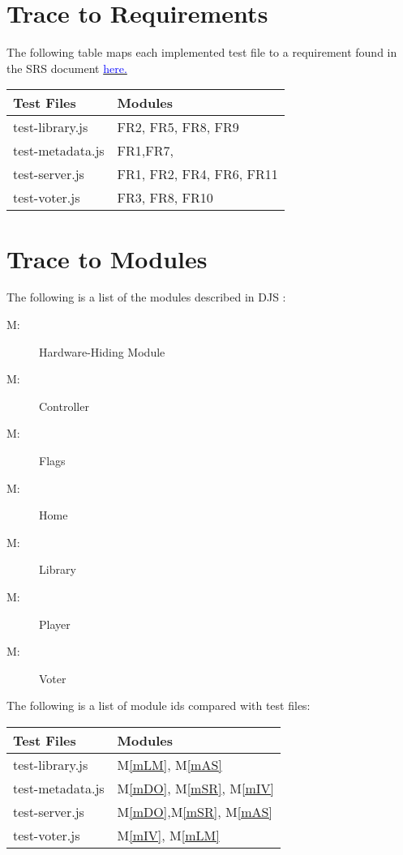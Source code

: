 \documentclass[12pt, titlepage]{article}
\newcounter{mnum}
\newcommand{\mthemnum}{M\themnum}
\newcommand{\mref}[1]{M\ref{#1}}
\begin{document}
\section{Trace to Requirements}
The following table maps each implemented test file to a requirement found in the SRS document \href{run:../../Doc/SRS/SRS.pdf}{\textcolor{blue}{here.}}
\begin{table}[H]
\centering
\begin{tabular}{p{} p{}}
\toprule
\textbf{Test Files} & \textbf{Modules}\\
\midrule
test-library.js & FR2, FR5, FR8, FR9\\
test-metadata.js & FR1,FR7,\\
test-server.js & FR1, FR2, FR4, FR6, FR11\\
test-voter.js & FR3, FR8, FR10\\

\bottomrule
\end{tabular}

\label{TblRT}
\end{table}
\section{Trace to Modules}
The following is a list of the modules described in DJS :
\begin{description}
\item [ \mthemnum \label{mHH}:] Hardware-Hiding Module
\item [ \mthemnum \label{mSR}:] Controller
\item [ \mthemnum \label{mAS}:] Flags
\item [ \mthemnum \label{mDO}:] Home
\item [ \mthemnum \label{mLM}:] Library
\item [ \mthemnum \label{mPM}:] Player
\item [ \mthemnum \label{mIV}:] Voter
\end{description}
The following is a list of module ids compared with test files: 
\begin{table}[H]
\centering
\begin{tabular}{p{} p{}}
\toprule
\textbf{Test Files} & \textbf{Modules}\\
\midrule
test-library.js & \mref{mLM}, \mref{mAS}\\
test-metadata.js & \mref{mDO}, \mref{mSR}, \mref{mIV}\\
test-server.js & \mref{mDO},\mref{mSR}, \mref{mAS}\\
test-voter.js & \mref{mIV}, \mref{mLM} \\

\bottomrule
\end{tabular}

\label{TblRT}
\end{table}
\end{document}

